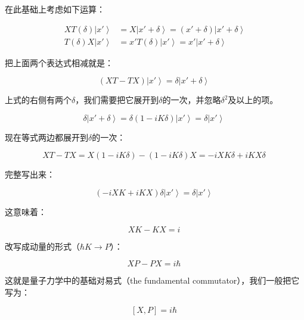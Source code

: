 在此基础上考虑如下运算：

\begin{align}
X T(\delta) \left| x' \right\rangle &= X \left| x' + \delta \right\rangle = \left( x' + \delta \right) \left| x' + \delta \right\rangle \\
T(\delta) X \left| x' \right\rangle &= x' T(\delta) \left| x' \right\rangle = x' \left| x' + \delta \right\rangle~
\end{align}

把上面两个表达式相减就是：

\begin{equation}
\left( XT - TX \right) \left| x' \right\rangle = \delta \left| x' + \delta \right\rangle~
\end{equation}

上式的右侧有两个$\delta$，我们需要把它展开到$\delta$的一次，并忽略$\delta^2$及以上的项。

\begin{equation}
\delta \left| x' + \delta \right\rangle = \delta \left( 1- i K \delta \right) \left| x' \right\rangle = \delta \left| x' \right\rangle~
\end{equation}

现在等式两边都展开到$\delta$的一次：

\begin{equation}
XT - TX = X \left( 1- i K \delta \right) - \left( 1- i K \delta \right) X = -i XK \delta + i KX \delta~
\end{equation}

完整写出来：

\begin{equation}
\left( -i XK + i KX \right) \delta \left| x' \right\rangle = \delta \left| x' \right\rangle~
\end{equation}

这意味着：

\begin{equation}
XK - KX = i~
\end{equation}

改写成动量的形式（$\hbar K \to P$）：

\begin{equation}
XP - PX = i \hbar~
\end{equation}

这就是量子力学中的基础对易式（the fundamental commutator），我们一般把它写为：

\begin{equation}
\left[ X, P \right] = i \hbar~
\end{equation}

